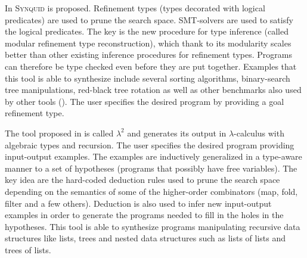 In \cite{DBLP:journals/corr/PolikarpovaS15} \textsc{Synquid} is proposed.
Refinement types (types decorated with logical predicates) are used to prune the search space. SMT-solvers are used to satisfy the logical predicates. The key is the new procedure for type inference (called modular refinement type reconstruction), which thank to its modularity scales better than other existing inference procedures for refinement types. Programs can therefore be type checked even before they are put together.
Examples that this tool is able to synthesize include several sorting algorithms,
binary-search tree manipulations, red-black tree rotation as well as other benchmarks also used by other tools ().
The user specifies the desired program by providing a goal refinement type.

The tool proposed in \cite{Feser:2015:SDS:2737924.2737977} is called $\lambda^2$ and generates its output in $\lambda$-calculus with algebraic types and recursion.
The user specifies the desired program providing input-output examples.  
The examples are inductively generalized in a type-aware manner to a set of hypotheses (programs that possibly have free variables).
The key idea are the hard-coded deduction rules used to prune the search space depending on the semantics of some of the higher-order combinators (map, fold, filter and a few others).
Deduction is also used to infer new input-output examples in order to generate the programs needed to fill in the holes in the hypotheses.
This tool is able to synthesize programs manipulating recursive data structures like lists, trees and nested data structures such as lists of lists and trees of lists.

